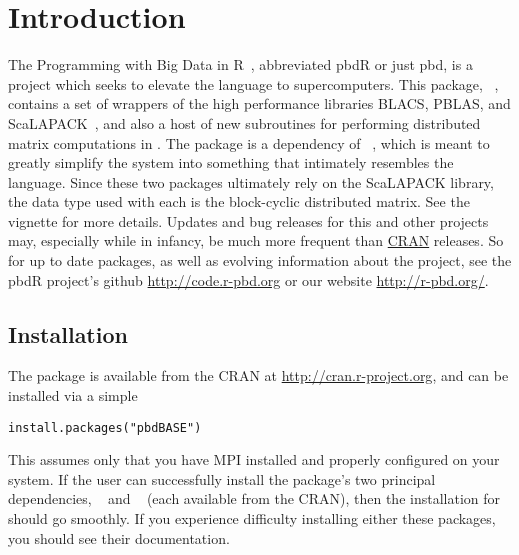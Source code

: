 \section[]{Introduction}
\label{sec:introduction}

The Programming with Big Data in R~\citep{pbdr2012}, abbreviated pbdR or just pbd, is a project which seeks to elevate the  language to supercomputers.  This package, ~\citep{Schmidt2012pbdBASEpackage}, contains a set of wrappers of the high performance libraries BLACS, PBLAS, and ScaLAPACK~\citep{slug}, and also a host of new subroutines for performing distributed matrix computations in .  The package is a dependency of ~\citep{Schmidt2012pbdDMATpackage}, which is meant to greatly simplify the  system into something that intimately resembles the  language.  Since these two packages ultimately rely on the ScaLAPACK library, the data type used with each is the block-cyclic distributed matrix.  See the  vignette for more details.
\np
Updates and bug releases for this and other  projects may, especially while in infancy, be much more frequent than \href{http://cran.r-project.org/}{CRAN} releases.  So for up to date packages, as well as evolving information about the  project,  see the pbdR project's github \url{http://code.r-pbd.org} or our website \href{http://r-pbd.org/}{http://r-pbd.org/}.


\subsection[]{Installation}
\label{sec:installation}

The  package is available from the CRAN at
\url{http://cran.r-project.org}, and can be installed via a simple 
\begin{lstlisting}[language=rr,title=Installing pbdBASE]
install.packages("pbdBASE")
\end{lstlisting}
This assumes only that you have MPI installed and properly configured on your system.  If the user can successfully install the package's two principal dependencies, ~\citep{Chen2012pbdMPIpackage} and ~\citep{Chen2012pbdSLAPpackage} (each available from the CRAN), then the installation for  should go smoothly.  If you experience difficulty installing either these packages, you should see their documentation.



